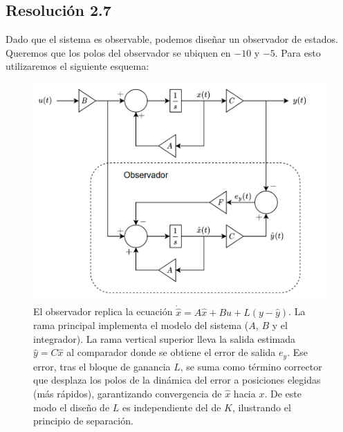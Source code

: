 \documentclass[
  11pt,
  letterpaper,
   addpoints,
   answers
  ]{exam}
\begin{document}
\begin{solution}
\subsection*{Resolución 2.7}
Dado que el sistema es observable, podemos diseñar un observador de estados. Queremos que los polos del observador se ubiquen en $-10$ y $-5$. Para esto utilizaremos el siguiente esquema:
  \begin{figure}[H]\centering
    \includegraphics[width=.6\textwidth]{../figures/Auxiliar_4_3.png}
    \caption{El observador replica la ecuación $\dot{\hat x}=A\hat x + Bu + L(y-\hat y)$. La rama principal implementa el modelo del sistema ($A$, $B$ y el integrador). La rama vertical superior lleva la salida estimada $\hat y = C\hat x$ al comparador donde se obtiene el error de salida $e_y$. Ese error, tras el bloque de ganancia $L$, se suma como término corrector que desplaza los polos de la dinámica del error a posiciones elegidas (más rápidos), garantizando convergencia de $\hat x$ hacia $x$. De este modo el diseño de $L$ es independiente del de $K$, ilustrando el principio de separación.}
  \end{figure}


\end{solution}
\end{document}
